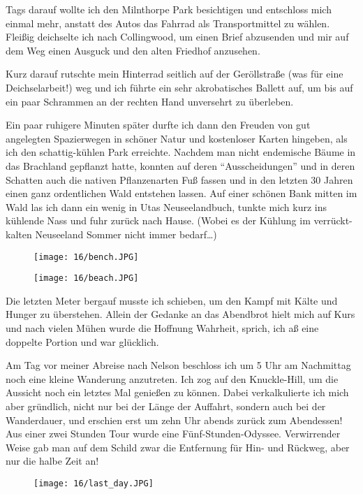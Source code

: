 Tags darauf wollte ich den Milnthorpe Park besichtigen und entschloss
mich einmal mehr, anstatt des Autos das Fahrrad als Transportmittel zu
wählen.  Fleißig deichselte ich nach Collingwood, um einen Brief
abzusenden und mir auf dem Weg einen Ausguck und den alten Friedhof
anzusehen.

Kurz darauf rutschte mein Hinterrad seitlich auf der Geröllstraße (was
für eine Deichselarbeit!) weg und ich führte ein sehr akrobatisches
Ballett auf, um bis auf ein paar Schrammen an der rechten Hand
unversehrt zu überleben.

Ein paar ruhigere Minuten später durfte ich dann den Freuden von gut
angelegten Spazierwegen in schöner Natur und kostenloser Karten
hingeben, als ich den schattig-kühlen Park erreichte. Nachdem man
nicht endemische Bäume in das Brachland gepflanzt hatte, konnten auf
deren ``Ausscheidungen'' und in deren Schatten auch die nativen
Pflanzenarten Fuß fassen und in den letzten 30 Jahren einen ganz
ordentlichen Wald entstehen lassen. Auf einer schönen Bank mitten im
Wald las ich dann ein wenig in Utas Neuseelandbuch, tunkte mich kurz
ins kühlende Nass und fuhr zurück nach Hause. (Wobei es der Kühlung im
verrückt-kalten Neuseeland Sommer nicht immer bedarf\ldots)
\begin{figure}[h]
  \centering
  \texttt{[image: 16/bench.JPG]}
\end{figure}
\begin{figure}[h]
  \centering
  \texttt{[image: 16/beach.JPG]}
\end{figure}

Die letzten Meter bergauf musste ich schieben, um den Kampf mit Kälte
und Hunger zu überstehen.  Allein der Gedanke an das Abendbrot hielt
mich auf Kurs und nach vielen Mühen wurde die Hoffnung Wahrheit,
sprich, ich aß eine doppelte Portion und war glücklich.

Am Tag vor meiner Abreise nach Nelson beschloss ich um 5 Uhr am
Nachmittag noch eine kleine Wanderung anzutreten. Ich zog auf den
Knuckle-Hill, um die Aussicht noch ein letztes Mal genießen zu können.
Dabei verkalkulierte ich mich aber gründlich, nicht nur bei der Länge
der Auffahrt, sondern auch bei der Wanderdauer, und erschien erst um
zehn Uhr abends zurück zum Abendessen! Aus einer zwei Stunden Tour wurde
eine Fünf-Stunden-Odyssee. Verwirrender Weise gab man auf dem Schild
zwar die Entfernung für Hin- und Rückweg, aber nur die halbe Zeit an!
\begin{figure}[h]
  \centering
  \texttt{[image: 16/last\_day.JPG]}
\end{figure}


